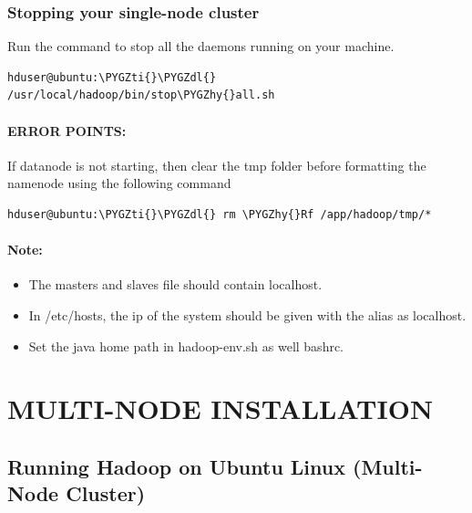 \documentclass[letterpaper,10pt,english]{sphinxmanual}
\def\PYGZdl{\char`\$}
\def\PYGZhy{\char`\-}
\def\PYGZti{\char`\~}
\begin{document}
\subsubsection{Stopping your single-node cluster}
\label{hadoop:stopping-your-single-node-cluster}
Run the command to stop all the daemons running on your machine.

\begin{Verbatim}[commandchars=\\\{\}]
hduser@ubuntu:\PYGZti{}\PYGZdl{} /usr/local/hadoop/bin/stop\PYGZhy{}all.sh
\end{Verbatim}


\paragraph{ERROR POINTS:}
\label{hadoop:error-points}
If datanode is not starting, then clear the tmp folder before formatting the namenode using the following command

\begin{Verbatim}[commandchars=\\\{\}]
hduser@ubuntu:\PYGZti{}\PYGZdl{} rm \PYGZhy{}Rf /app/hadoop/tmp/*
\end{Verbatim}


\paragraph{Note:}
\label{hadoop:id4}\begin{itemize}
\item {} 
The masters and slaves file should contain localhost.

\item {} 
In /etc/hosts, the ip of the system should be given with the alias as localhost.

\item {} 
Set the java home path in hadoop-env.sh as well bashrc.

\end{itemize}


\section{MULTI-NODE INSTALLATION}
\label{hadoop:multi-node-installation}

\subsection{Running Hadoop on Ubuntu Linux (Multi-Node Cluster)}
\label{hadoop:running-hadoop-on-ubuntu-linux-multi-node-cluster}
\end{document}
